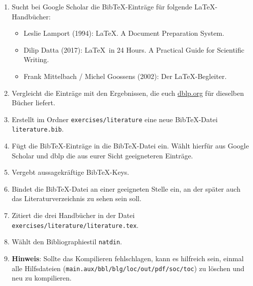 \begin{enumerate}
  \item Sucht bei Google Scholar die Bib\TeX-Einträge für folgende \LaTeX-Handbücher:
  \begin{itemize}
    \item Leslie Lamport (1994): \LaTeX. A Document Preparation System.
    \item Dilip Datta (2017): \LaTeX\ in 24 Hours. A Practical Guide for Scientific Writing.
    \item Frank Mittelbach / Michel Goossens (2002): Der \LaTeX-Begleiter.
  \end{itemize}
  \item Vergleicht die Einträge mit den Ergebnissen, die euch \url{dblp.org} für dieselben Bücher liefert.
  \item Erstellt im Ordner \texttt{exercises/literature} eine neue Bib\TeX-Datei \texttt{literature.bib}.
  \item Fügt die Bib\TeX-Einträge in die Bib\TeX-Datei ein. Wählt hierfür aus Google Scholar und dblp die aus eurer Sicht geeigneteren Einträge.
  \item Vergebt aussagekräftige Bib\TeX-Keys.
  \item Bindet die Bib\TeX-Datei an einer geeigneten Stelle ein, an der später auch das Literaturverzeichnis zu sehen sein soll.
  \item Zitiert die drei Handbücher in der Datei \texttt{exercises/literature/literature.tex}.
  \item Wählt den Bibliographiestil \texttt{natdin}.
  \item \textbf{Hinweis}: Sollte das Kompilieren fehlschlagen, kann es hilfreich sein, einmal alle Hilfsdateien (\texttt{main.aux/bbl/blg/loc/out/pdf/soc/toc}) zu löschen und neu zu kompilieren.
\end{enumerate}

